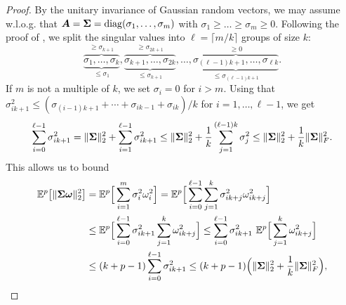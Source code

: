 \begin{proof}
By the unitary invariance of Gaussian random vectors, we may assume w.l.o.g. that $\boldsymbol{A} = \boldsymbol{\Sigma} = \operatorname{diag}(\sigma_1, \dots, \sigma_m)$ with $\sigma_1 \geq \dots \geq \sigma_m \geq 0$.
Following the proof of \cite[Theorem 1]{cohen-2016-optimal-approximate}, we split the singular values into $\ell = \lceil m/k \rceil$ groups of size $k$:
    \begin{equation}
        \overbrace{\underbrace{\sigma_1, \dots, \sigma_k}_{\leq \sigma_1}}^{\geq \sigma_{k+1}}, \overbrace{\underbrace{\sigma_{k+1}, \dots, \sigma_{2k}}_{\leq \sigma_{k+1}}}^{\geq \sigma_{2k+1}}, \dots, \overbrace{\underbrace{\sigma_{(\ell - 1)k + 1}, \dots, \sigma_{\ell k}}_{\leq \sigma_{(\ell - 1)k + 1}}}^{\geq 0}.
    \end{equation}
    If $m$ is not a multiple of $k$, we set $\sigma_i = 0$ for $i > m$. Using that
        $\sigma_{ik + 1}^2 \leq ( \sigma_{(i-1)k + 1} + \cdots + \sigma_{ik - 1} + \sigma_{ik} ) / k$ for $i = 1,\ldots, \ell-1$, we get
    \begin{equation}
        \sum_{i=0}^{\ell-1} \sigma_{ik + 1}^2 = \lVert \boldsymbol{\Sigma} \rVert _2^2 + \sum_{i=1}^{\ell-1} \sigma_{ik + 1}^2  \leq \lVert \boldsymbol{\Sigma} \rVert _2^2 + \frac{1}{k} \sum_{j=1}^{(\ell - 1)k} \sigma_j^2 \leq \lVert \boldsymbol{\Sigma} \rVert _2^2 + \frac{1}{k} \lVert \boldsymbol{\Sigma} \rVert _F^2.
        \label{equ:singular-value-group-bound}
    \end{equation}
    This allows us to bound
    \begin{align*}
    \mathbb{E}^{p}\big[ \lVert \boldsymbol{\Sigma} \boldsymbol{\omega} \rVert _2^2 \big] & = 
        \mathbb{E}^{p}\Big[ \sum_{i=1}^{m} \sigma_i^2 \omega_i^2 \Big]
        = \mathbb{E}^{p}\Big[ \sum_{i=0}^{\ell - 1} \sum_{j=1}^{k} \sigma_{ik + j}^2 \omega_{ik + j}^2 \Big] \\
        &\leq \mathbb{E}^{p}\Big[ \sum_{i=0}^{\ell - 1} \sigma_{ik + 1}^2 \sum_{j=1}^{k} \omega_{ik + j}^2 \Big] 
        \leq \sum_{i=0}^{\ell - 1} \sigma_{ik + 1}^2 ~ \mathbb{E}^{p}\Big[ \sum_{j=1}^{k} \omega_{ik + j}^2 \Big] \\
        &\leq (k + p - 1) \sum_{i=0}^{\ell - 1} \sigma_{ik + 1}^2 \leq (k + p - 1) \Big( \lVert \boldsymbol{\Sigma} \rVert _2^2 + \frac{1}{k} \lVert \boldsymbol{\Sigma} \rVert _F^2 \Big), 
    \end{align*}

\end{proof}
